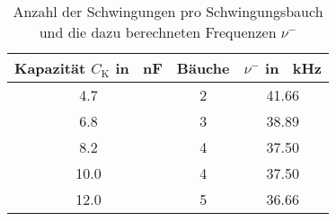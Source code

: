 \begin{table}[h!]
\begin{center}
\begin{tabular}{c | c | c}
	Kapazität $C_\text{K}$ in \SI{}{\nano\farad} & Bäuche & $\nu^-$ in \SI{}{\kilo\hertz} \\
	\hline
	4.7 & 2 & 41.66 \\
	6.8 & 3 & 38.89 \\
	8.2 & 4 & 37.50 \\
	10.0 & 4 & 37.50 \\
	12.0 & 5 & 36.66 \\
\end{tabular}
\end{center}
\caption{Anzahl der Schwingungen pro Schwingungsbauch und die dazu berechneten Frequenzen $\nu^-$}
\label{fig:Freq_Bauch}
\end{table}